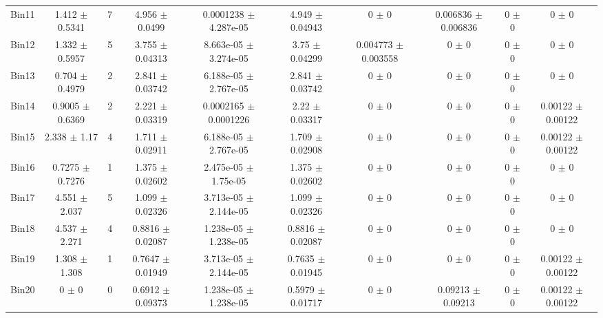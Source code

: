 \begin{tabular}{@{\extracolsep{4pt}}lccccccccc@{}}
     Bin11 & 1.412 $\pm$ 0.5341 & 7 & 4.956 $\pm$ 0.0499 & 0.0001238 $\pm$ 4.287e-05 & 4.949 $\pm$ 0.04943 & 0 $\pm$ 0 & 0.006836 $\pm$ 0.006836 & 0 $\pm$ 0 & 0 $\pm$ 0 \\ 
     Bin12 & 1.332 $\pm$ 0.5957 & 5 & 3.755 $\pm$ 0.04313 & 8.663e-05 $\pm$ 3.274e-05 & 3.75 $\pm$ 0.04299 & 0.004773 $\pm$ 0.003558 & 0 $\pm$ 0 & 0 $\pm$ 0 & 0 $\pm$ 0 \\ 
     Bin13 & 0.704 $\pm$ 0.4979 & 2 & 2.841 $\pm$ 0.03742 & 6.188e-05 $\pm$ 2.767e-05 & 2.841 $\pm$ 0.03742 & 0 $\pm$ 0 & 0 $\pm$ 0 & 0 $\pm$ 0 & 0 $\pm$ 0 \\ 
     Bin14 & 0.9005 $\pm$ 0.6369 & 2 & 2.221 $\pm$ 0.03319 & 0.0002165 $\pm$ 0.0001226 & 2.22 $\pm$ 0.03317 & 0 $\pm$ 0 & 0 $\pm$ 0 & 0 $\pm$ 0 & 0.00122 $\pm$ 0.00122 \\ 
     Bin15 & 2.338 $\pm$ 1.17 & 4 & 1.711 $\pm$ 0.02911 & 6.188e-05 $\pm$ 2.767e-05 & 1.709 $\pm$ 0.02908 & 0 $\pm$ 0 & 0 $\pm$ 0 & 0 $\pm$ 0 & 0.00122 $\pm$ 0.00122 \\ 
     Bin16 & 0.7275 $\pm$ 0.7276 & 1 & 1.375 $\pm$ 0.02602 & 2.475e-05 $\pm$ 1.75e-05 & 1.375 $\pm$ 0.02602 & 0 $\pm$ 0 & 0 $\pm$ 0 & 0 $\pm$ 0 & 0 $\pm$ 0 \\ 
     Bin17 & 4.551 $\pm$ 2.037 & 5 & 1.099 $\pm$ 0.02326 & 3.713e-05 $\pm$ 2.144e-05 & 1.099 $\pm$ 0.02326 & 0 $\pm$ 0 & 0 $\pm$ 0 & 0 $\pm$ 0 & 0 $\pm$ 0 \\ 
     Bin18 & 4.537 $\pm$ 2.271 & 4 & 0.8816 $\pm$ 0.02087 & 1.238e-05 $\pm$ 1.238e-05 & 0.8816 $\pm$ 0.02087 & 0 $\pm$ 0 & 0 $\pm$ 0 & 0 $\pm$ 0 & 0 $\pm$ 0 \\ 
     Bin19 & 1.308 $\pm$ 1.308 & 1 & 0.7647 $\pm$ 0.01949 & 3.713e-05 $\pm$ 2.144e-05 & 0.7635 $\pm$ 0.01945 & 0 $\pm$ 0 & 0 $\pm$ 0 & 0 $\pm$ 0 & 0.00122 $\pm$ 0.00122 \\ 
     Bin20 & 0 $\pm$ 0 & 0 & 0.6912 $\pm$ 0.09373 & 1.238e-05 $\pm$ 1.238e-05 & 0.5979 $\pm$ 0.01717 & 0 $\pm$ 0 & 0.09213 $\pm$ 0.09213 & 0 $\pm$ 0 & 0.00122 $\pm$ 0.00122 \\ 
\hline\hline
  \end{tabular}
